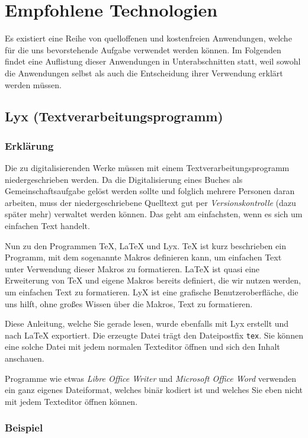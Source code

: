 
\section{Empfohlene Technologien}

Es existiert eine Reihe von quelloffenen und kostenfreien Anwendungen,
welche für die uns bevorstehende Aufgabe verwendet werden können.
Im Folgenden findet eine Auflistung dieser Anwendungen in Unterabschnitten
statt, weil sowohl die Anwendungen selbst als auch die Entscheidung
ihrer Verwendung erklärt werden müssen.

\subsection{Lyx (Textverarbeitungsprogramm)}

\subsubsection{Erklärung}

Die zu digitalisierenden Werke müssen mit einem Textverarbeitungsprogramm
niedergeschrieben werden. Da die Digitalisierung eines Buches als
Gemeinschaftsaufgabe gelöst werden sollte und folglich mehrere Personen
daran arbeiten, muss der niedergeschriebene Quelltext gut per \emph{Versionskontrolle}
(dazu später mehr) verwaltet werden können. Das geht am einfachsten,
wenn es sich um einfachen Text handelt.

Nun zu den Programmen \TeX , \LaTeX{} und Lyx. \TeX{} ist kurz beschrieben
ein Programm, mit dem sogenannte Makros definieren kann, um einfachen
Text unter Verwendung dieser Makros zu formatieren. \LaTeX{} ist quasi
eine Erweiterung von \TeX{} und eigene Makros bereits definiert, die
wir nutzen werden, um einfachen Text zu formatieren. LyX ist eine
grafische Benutzeroberfläche, die uns hilft, ohne großes Wissen über
die Makros, Text zu formatieren.

Diese Anleitung, welche Sie gerade lesen, wurde ebenfalls mit Lyx
erstellt und nach \LaTeX{} exportiert. Die erzeugte Datei trägt den
Dateipostfix \texttt{tex}. Sie können eine solche Datei mit jedem
normalen Texteditor öffnen und sich den Inhalt anschauen.

Programme wie etwas \emph{Libre Office Writer} und \emph{Microsoft
Office Word} verwenden ein ganz eigenes Dateiformat, welches binär
kodiert ist und welches Sie eben nicht mit jedem Texteditor öffnen
können.

\subsubsection{Beispiel}

